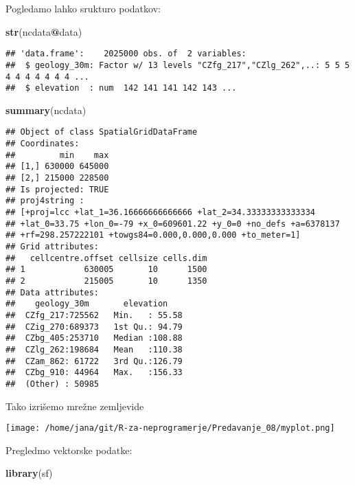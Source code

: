 \documentclass[]{article}
\newenvironment{Shaded}{\begin{snugshade}}{\end{snugshade}}
\newcommand{\KeywordTok}[1]{\textcolor[rgb]{0.13,0.29,0.53}{\textbf{#1}}}
\newcommand{\OperatorTok}[1]{\textcolor[rgb]{0.81,0.36,0.00}{\textbf{#1}}}
\newcommand{\NormalTok}[1]{#1}
\begin{document}
Pogledamo lahko srukturo podatkov:

\begin{Shaded}
\begin{Highlighting}[]
\KeywordTok{str}\NormalTok{(ncdata}\OperatorTok{@}\NormalTok{data)}
\end{Highlighting}
\end{Shaded}

\begin{verbatim}
## 'data.frame':    2025000 obs. of  2 variables:
##  $ geology_30m: Factor w/ 13 levels "CZfg_217","CZlg_262",..: 5 5 5 4 4 4 4 4 4 4 ...
##  $ elevation  : num  142 141 141 142 143 ...
\end{verbatim}

\begin{Shaded}
\begin{Highlighting}[]
\KeywordTok{summary}\NormalTok{(ncdata)}
\end{Highlighting}
\end{Shaded}

\begin{verbatim}
## Object of class SpatialGridDataFrame
## Coordinates:
##         min    max
## [1,] 630000 645000
## [2,] 215000 228500
## Is projected: TRUE 
## proj4string :
## [+proj=lcc +lat_1=36.16666666666666 +lat_2=34.33333333333334
## +lat_0=33.75 +lon_0=-79 +x_0=609601.22 +y_0=0 +no_defs +a=6378137
## +rf=298.257222101 +towgs84=0.000,0.000,0.000 +to_meter=1]
## Grid attributes:
##   cellcentre.offset cellsize cells.dim
## 1            630005       10      1500
## 2            215005       10      1350
## Data attributes:
##    geology_30m       elevation     
##  CZfg_217:725562   Min.   : 55.58  
##  CZig_270:689373   1st Qu.: 94.79  
##  CZbg_405:253710   Median :108.88  
##  CZlg_262:198684   Mean   :110.38  
##  CZam_862: 61722   3rd Qu.:126.79  
##  CZbg_910: 44964   Max.   :156.33  
##  (Other) : 50985
\end{verbatim}

Tako izrišemo mrežne zemljevide

\texttt{[image: /home/jana/git/R-za-neprogramerje/Predavanje\_08/myplot.png]}

Pregledmo vektorske podatke:

\begin{Shaded}
\begin{Highlighting}[]
\KeywordTok{library}\NormalTok{(sf)}
\end{Highlighting}
\end{Shaded}
\end{document}
